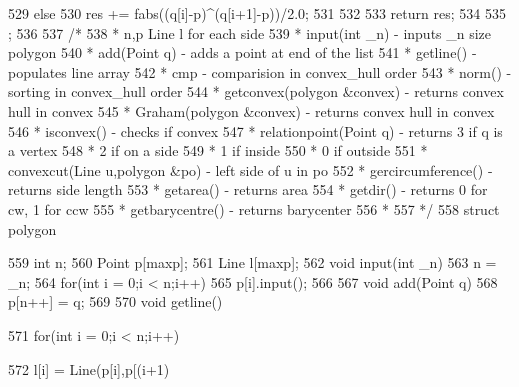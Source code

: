\documentclass[11pt]{article}
\begin{document}
\begin{Code}
{{{529              else{
530                  res += fabs((q[i]-p)^(q[i+1]-p))/2.0;
531              }
532         }
533         return res;
534     }
535 };
536
537 /*
538 * n,p Line l for each side
539 * input(int _n)                          - inputs _n size polygon
540 * add(Point q)                           - adds a point at end of
        the list
541 * getline()                              - populates line array
542 * cmp                                    - comparision in
        convex_hull order
543 * norm()                                 - sorting in convex_hull
        order
544 * getconvex(polygon &convex)             - returns convex hull in
        convex
545 * Graham(polygon &convex)                - returns convex hull in
        convex
546 * isconvex()                             - checks if convex
547 * relationpoint(Point q)                 - returns 3 if q is a
        vertex
548 *                                                  2 if on a side
549 *                                                  1 if inside
550 *                                                  0 if outside
551 * convexcut(Line u,polygon &po)          - left side of u in po
552 * gercircumference()                     - returns side length
553 * getarea()                              - returns area
554 * getdir()                               - returns 0 for cw, 1 for
        ccw
555 * getbarycentre()                        - returns barycenter
556 *
557 */
558 struct polygon{
559     int n;
560     Point p[maxp];
561     Line l[maxp];
562     void input(int _n){
563         n = _n;
564         for(int i = 0;i < n;i++)
565              p[i].input();
566     }
567     void add(Point q){
568         p[n++] = q;
569     }
570     void getline(){
571         for(int i = 0;i < n;i++){
572              l[i] = Line(p[i],p[(i+1)%


}}}
\end{Code}
\end{document}
